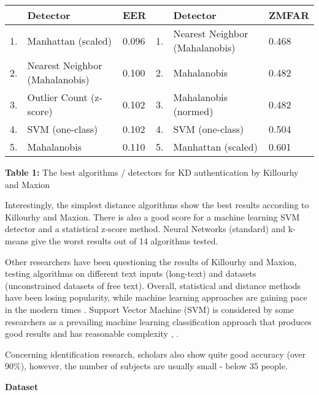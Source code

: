\documentclass[12pt,a4]{article}
\begin{document}
\begin{center}

\begin{tabular*}{\textwidth}{l @{\extracolsep{\fill}} lllll}

\hline
 & \textbf{Detector} & \textbf{EER} & & \textbf{Detector} & \textbf{ZMFAR} \\
 \hline
1. & Manhattan (scaled) & 0.096 & 1. & Nearest Neighbor (Mahalanobis) & 0.468 \\ 
\hline
2. & Nearest Neighbor (Mahalanobis) & 0.100 & 2. & Mahalanobis & 0.482 \\ 
\hline
3. & Outlier Count (z-score) & 0.102 & 3. & Mahalanobis (normed) & 0.482 \\

\hline
4. & SVM (one-class) & 0.102 & 4. & SVM (one-class) & 0.504 \\
\hline
5. & Mahalanobis & 0.110 & 5. & Manhattan (scaled) & 0.601 \\
\hline
\end{tabular*}
\caption{\textbf{Table 1:} The best algorithms / detectors for KD authentication by Killourhy and Maxion}
\end{center}

Interestingly, the simplest distance algorithms show the best results according to Killourhy and Maxion. There is also a good score for a machine learning SVM detector and a statistical z-score method. Neural Networks (standard) and k-means give the worst results out of 14 algorithms tested.

Other researchers have been questioning the results of Killourhy and Maxion, testing algorithms on different text inputs (long-text) and datasets (unconstrained datasets of free text). Overall, statistical and distance methods have been losing popularity, while machine learning approaches are gaining pace in the modern times \cite{Liakat:2017}. Support Vector Machine (SVM) is  considered by some researchers as a prevailing machine learning classification approach that produces good results and has reasonable complexity \cite{Liakat:2017}, \cite{raul2020comprehensive}.

Concerning identification research, scholars also show quite good accuracy (over 90\%)\cite{banerjee2012biometric}, however, the number of subjects are usually small - below 35 people. 

\bigskip
\large\textbf{Dataset}
\bigskip
\end{document}
